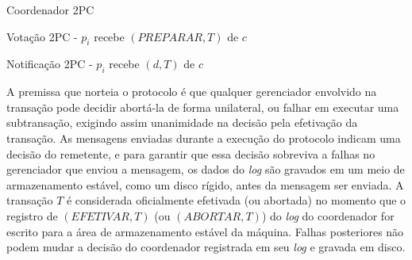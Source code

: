 \documentclass[11pt,twoside,a4paper]{book}
\begin{document}
\begin{algorithm}
\caption{Coordenador 2PC}
\label{alg:2pc_coordenador}
\end{algorithm}

\begin{algorithm}
\caption{Votação 2PC - $p_i$ recebe $(PREPARAR, T)$ de $c$}
\label{alg:2pc_participante1}
\end{algorithm}

\begin{algorithm}
\caption{Notificação 2PC - $p_i$ recebe $(d, T)$ de $c$}
\label{alg:2pc_participante2}
\end{algorithm}

A premissa que norteia o protocolo é que qualquer gerenciador envolvido na
transação pode decidir abortá-la de forma unilateral, ou falhar em executar uma
subtransação, exigindo assim unanimidade na decisão pela efetivação da
transação.
As mensagens enviadas durante a execução do protocolo indicam uma decisão do remetente, e para garantir que essa decisão sobreviva a falhas no 
gerenciador que enviou a mensagem, os dados do \emph{log} são gravados em um meio de armazenamento estável, como um disco rígido, antes da 
mensagem ser enviada. A transação $T$ é considerada oficialmente efetivada (ou abortada) no momento que o registro de $(EFETIVAR, T)$ 
(ou $(ABORTAR, T)$) do \emph{log} do coordenador for escrito para a área de armazenamento estável da máquina. Falhas posteriores não podem mudar 
a decisão do coordenador registrada em seu \emph{log} e gravada em disco.
\end{document}
